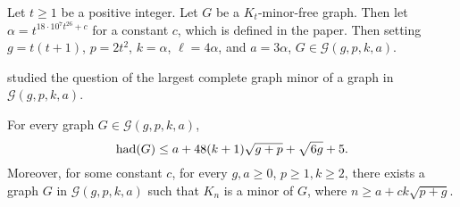 \begin{theorem}
	Let $t \geq 1$ be a positive integer. Let $G$ be a $K_t$-minor-free graph. Then let $\alpha = t^{18 \cdot 10^{7} t^{26} + c}$ for a constant $c$, which is defined in the paper. Then setting $g = t(t+1)$, $p = 2t^2$, $k = \alpha$, $\ell = 4\alpha$, and $a = 3\alpha$, $G \in \mathcal{G}(g,p,k,a)$. 
\end{theorem}

\textcite{joretCompleteGraphMinors2013} studied the question of the largest complete graph minor of a graph in $\mathcal{G}(g, p, k, a)$. 

\begin{theorem}\label{thm:graph_structure_bound_theorem}
	For every graph \(G \in \mathcal{G}(g, p, k, a)\),
	\[\operatorname{had}(G) \leq a + 48(k + 1)\sqrt{g + p} + \sqrt{6g} + 5.\] Moreover, for some constant $c$, for every $g, a \geq 0$, $p \geq 1, k \geq 2$, there exists a graph $G$ in \(\mathcal{G}(g, p, k, a)\) such that \(K_n\) is a minor of $G$, where \(n \geq a + c k\sqrt{p + g}\).
\end{theorem}
